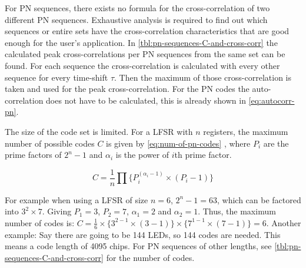 For PN sequences, there exists no formula for the cross-correlation of two different PN sequences. 
Exhaustive analysis is required to find out which sequences or entire sets have the cross-correlation characteristics that are good enough for the user's application.
In \autoref{tbl:pn-sequences-C-and-cross-corr} the calculated peak cross-correlations per PN sequences from the same set can be found.
For each sequence the cross-correlation is calculated with every other sequence for every time-shift $\tau$. 
Then the maximum of those cross-correlation is taken and used for the peak cross-correlation.
For the PN codes the auto-correlation does not have to be calculated, this is already shown in \autoref{eq:autocorr-pn}.



The size of the code set is limited.
For a LFSR with $n$ registers, the maximum number of possible codes $C$ is given by \autoref{eq:num-of-pn-codes} \cite{mutagi1996pseudo}, where $P_i$ are the prime factors of $2^n - 1$ and $\alpha_i$ is the power of $i$th prime factor.

\begin{equation}
	\label{eq:num-of-pn-codes}
	C = \frac{1}{n} \prod \{ P_{i} ^ {(\alpha_i - 1)} \times (P_i - 1) \}
\end{equation}

For example when using a LFSR of size $n = 6$, $2^n - 1 = 63$, which can be factored into $3^2 \times 7$.
Giving $P_1 = 3$, $P_2 = 7$, $\alpha_1 = 2$ and $\alpha_2 = 1$.
Thus, the maximum number of codes is: $C = \frac{1}{6} \times \{ 3^{2 - 1} \times (3 - 1) \} \times \{ 7^{1 - 1} \times (7 - 1) \} = 6$.
Another example: Say there are going to be 144 LEDs, so 144 codes are needed. 
This means a code length of 4095 chips.
For PN sequences of other lengths, see \autoref{tbl:pn-sequences-C-and-cross-corr} for the number of codes.


